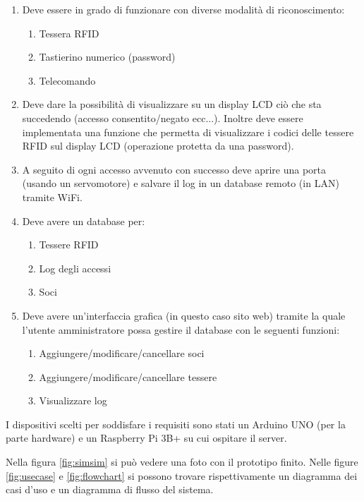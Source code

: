 \documentclass[12pt]{report}
\begin{document}
\begin{enumerate}
	\item Deve essere in grado di funzionare con diverse modalità di riconoscimento:
	\begin{enumerate}
		\item Tessera RFID
		\item Tastierino numerico (password)
		\item Telecomando 
	\end{enumerate}
	\item Deve dare la possibilità di visualizzare su un display LCD ciò che sta succedendo (accesso consentito/negato ecc...). Inoltre deve essere implementata una funzione che permetta di visualizzare i codici delle tessere RFID sul display LCD (operazione protetta da una password).
	\item A seguito di ogni accesso avvenuto con successo deve aprire una porta (usando un servomotore) e salvare il log in un database remoto (in LAN) tramite WiFi.
	\item Deve avere un database per:
	\begin{enumerate}
		\item Tessere RFID
		\item Log degli accessi
		\item Soci
	\end{enumerate}
	\item Deve avere un'interfaccia grafica (in questo caso sito web) tramite la quale l'utente amministratore possa gestire il database con le seguenti funzioni: 
	\begin{enumerate}
		\item Aggiungere/modificare/cancellare soci 
		\item Aggiungere/modificare/cancellare tessere 
		\item Visualizzare log
	\end{enumerate}
\end{enumerate}
I dispositivi scelti per soddisfare i requisiti sono stati un Arduino UNO (per la parte hardware) e un Raspberry Pi 3B+ su cui ospitare il server. 

Nella figura \ref{fig:simsim} si può vedere una foto con il prototipo finito.
Nelle figure \ref{fig:usecase} e \ref{fig:flowchart} si possono trovare rispettivamente un diagramma dei casi d'uso e un diagramma di flusso del sistema.
\end{document}
